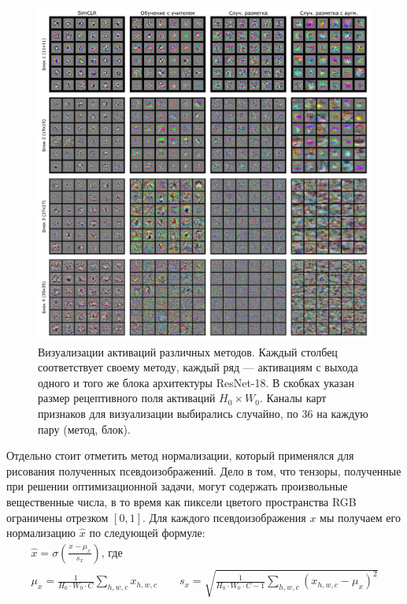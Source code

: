 \begin{figure}[H]
    \centering
    \includegraphics[width=17cm]{images/activations.pdf}
    \caption{Визуализации активаций различных методов. Каждый столбец соответствует своему методу, каждый ряд --- активациям с выхода одного и того же блока архитектуры ResNet-18. В скобках указан размер рецептивного поля активаций $H_0 \times W_0$. Каналы карт признаков для визуализации выбирались случайно, по 36 на каждую пару (метод, блок).}
    \label{visual:pic:4}
\end{figure}{}

Отдельно стоит отметить метод нормализации, который применялся для рисования полученных псевдоизображений. Дело в том, что тензоры, полученные при решении оптимизационной задачи, могут содержать произвольные вещественные числа, в то время как пиксели цветого пространства RGB ограничены отрезком $[0, 1]$. Для каждого псевдоизображения $x$ мы получаем его нормализацию $\hat{x}$ по следующей формуле:
\begin{equation}
\begin{gathered}
    \hat{x} = \sigma \left(\frac{x - \mu_{x}}{s_x}\right)\text{, где} \\
    \mu_x = \frac{1}{H_0 \cdot W_0 \cdot C} \sum_{h, w, c} x_{h, w, c} \quad\quad
    s_x = \sqrt{\frac{1}{H_0 \cdot W_0 \cdot C- 1} \sum_{h, w, c} (x_{h, w, c} - \mu_x)^2}
\end{gathered}
\end{equation}

